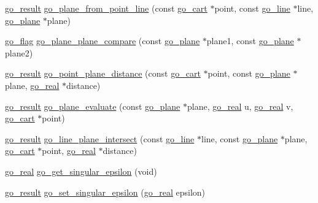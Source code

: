 \begin{DoxyCompactItemize}
\item 
\hyperlink{gotypes_8h_a55d48b38cd959f63c7e8db8337a9792a}{go\-\_\-result} \hyperlink{namespacegomotion_a3f05dac5f9be2e82ec390a70d03ea058}{go\-\_\-plane\-\_\-from\-\_\-point\-\_\-line} (const \hyperlink{structgomotion_1_1go__cart}{go\-\_\-cart} $\ast$point, const \hyperlink{structgomotion_1_1go__line}{go\-\_\-line} $\ast$line, \hyperlink{structgomotion_1_1go__plane}{go\-\_\-plane} $\ast$plane)
\item 
\hyperlink{gotypes_8h_ae890d9a0ddecc0d3073622cc4312092d}{go\-\_\-flag} \hyperlink{namespacegomotion_a522b91008a97b01ef46291dcd5bcb2e0}{go\-\_\-plane\-\_\-plane\-\_\-compare} (const \hyperlink{structgomotion_1_1go__plane}{go\-\_\-plane} $\ast$plane1, const \hyperlink{structgomotion_1_1go__plane}{go\-\_\-plane} $\ast$plane2)
\item 
\hyperlink{gotypes_8h_a55d48b38cd959f63c7e8db8337a9792a}{go\-\_\-result} \hyperlink{namespacegomotion_a9e922da92de4833b51a5867e8fd99cca}{go\-\_\-point\-\_\-plane\-\_\-distance} (const \hyperlink{structgomotion_1_1go__cart}{go\-\_\-cart} $\ast$point, const \hyperlink{structgomotion_1_1go__plane}{go\-\_\-plane} $\ast$plane, \hyperlink{gotypes_8h_afd666a2393eebd71ee455846ac9def9b}{go\-\_\-real} $\ast$distance)
\item 
\hyperlink{gotypes_8h_a55d48b38cd959f63c7e8db8337a9792a}{go\-\_\-result} \hyperlink{namespacegomotion_a45d26171e087d7b1abf3664a127d7006}{go\-\_\-plane\-\_\-evaluate} (const \hyperlink{structgomotion_1_1go__plane}{go\-\_\-plane} $\ast$plane, \hyperlink{gotypes_8h_afd666a2393eebd71ee455846ac9def9b}{go\-\_\-real} u, \hyperlink{gotypes_8h_afd666a2393eebd71ee455846ac9def9b}{go\-\_\-real} v, \hyperlink{structgomotion_1_1go__cart}{go\-\_\-cart} $\ast$point)
\item 
\hyperlink{gotypes_8h_a55d48b38cd959f63c7e8db8337a9792a}{go\-\_\-result} \hyperlink{namespacegomotion_a07b423b2ecb498fbdc2cc810ae52980c}{go\-\_\-line\-\_\-plane\-\_\-intersect} (const \hyperlink{structgomotion_1_1go__line}{go\-\_\-line} $\ast$line, const \hyperlink{structgomotion_1_1go__plane}{go\-\_\-plane} $\ast$plane, \hyperlink{structgomotion_1_1go__cart}{go\-\_\-cart} $\ast$point, \hyperlink{gotypes_8h_afd666a2393eebd71ee455846ac9def9b}{go\-\_\-real} $\ast$distance)
\item 
\hyperlink{gotypes_8h_afd666a2393eebd71ee455846ac9def9b}{go\-\_\-real} \hyperlink{namespacegomotion_ac58aa8880f6ed18a0ad78b356f579698}{go\-\_\-get\-\_\-singular\-\_\-epsilon} (void)
\item 
\hyperlink{gotypes_8h_a55d48b38cd959f63c7e8db8337a9792a}{go\-\_\-result} \hyperlink{namespacegomotion_a19aaf652f4b2c5c8c3ea1829d0e2cc99}{go\-\_\-set\-\_\-singular\-\_\-epsilon} (\hyperlink{gotypes_8h_afd666a2393eebd71ee455846ac9def9b}{go\-\_\-real} epsilon)

\end{DoxyCompactItemize}
